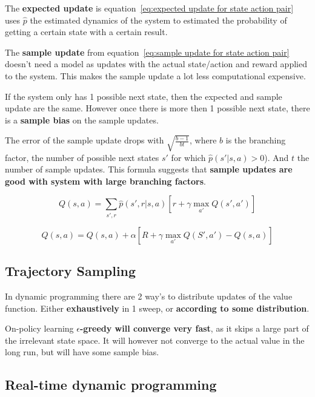The \textbf{expected update} is equation~\ref{eq:expected update for state action pair} uses $\hat{p}$ the estimated dynamics of the system to estimated the probability of getting a certain state with a certain result. 

The \textbf{sample update} from equation~\ref{eq:sample update for state action pair} doesn't need a model as updates with the actual state/action and reward applied to the system. This makes the sample update a lot less computational expensive.

If the system only has 1 possible next state, then the expected and sample update are the same. However once there is more then 1 possible next state, there is a \textbf{sample bias} on the sample updates.

The error of the sample update drops with $\sqrt{\frac{b-1}{bt}}$, where $b$ is the branching factor, the number of possible next states $s'$ for which $\hat{p}(s'|s,a)>0$). And $t$ the number of sample updates. This formula suggests that \textbf{sample updates are good with system with large branching factors}. 

\begin{equation}
Q(s, a) = \sum_{s', r} \hat{p}(s', r| s, a)[r + \gamma \max_{a'}Q(s', a')]
\label{eq:expected update for state action pair}
\end{equation}

\begin{equation}
Q(s, a) = Q(s, a) + \alpha[R + \gamma \max_{a'}Q(S', a') - Q(s, a)]
\label{eq:sample update for state action pair}
\end{equation}

\subsection{Trajectory Sampling}

In dynamic programming there are 2 way's to distribute updates of the value function. Either \textbf{exhaustively} in 1 sweep, or \textbf{according to some distribution}.

On-policy learning \textbf{$\epsilon$-greedy will converge very fast}, as it skips a large part of the irrelevant state space. It will however not converge to the actual value in the long run, but will have some sample bias. 

\subsection{Real-time dynamic programming}

